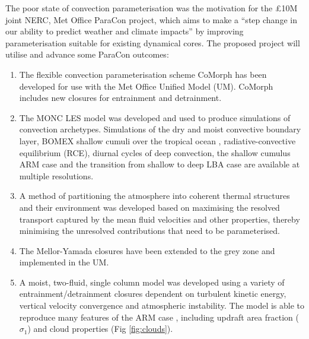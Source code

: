 \documentclass[11pt,a4paper]{article}
\begin{document}
The poor state of convection parameterisation was the motivation for the \pounds 10M joint NERC, Met Office ParaCon project, which aims to make a ``step change in our ability to predict weather and climate impacts'' by improving parameterisation suitable for existing dynamical cores. The proposed project will utilise and advance some ParaCon outcomes:
\begin{enumerate}
\item The flexible convection parameterisation scheme CoMorph has been developed for use with the Met Office Unified Model (UM). CoMorph includes new closures for entrainment and detrainment.

\item The MONC LES model was developed and used to produce simulations of convection archetypes. Simulations of the dry and moist convective boundary layer, BOMEX shallow cumuli over the tropical ocean \cite[]{HR73}, radiative-convective equilibrium (RCE), diurnal cycles of deep convection, the shallow cumulus ARM case \cite[]{BCC+02} and the transition from shallow to deep LBA case \cite[]{BFGB02} are available at multiple resolutions.

\item A method of partitioning the atmosphere into coherent thermal structures and their environment was developed \cite[]{ETB20} based on maximising the resolved transport captured by the mean fluid velocities and other properties, thereby minimising the unresolved contributions that need to be parameterised.

\item The Mellor-Yamada closures have been extended to the grey zone and implemented in the UM.

\item A moist, two-fluid, single column model was developed using a variety of entrainment/detrainment closures dependent on turbulent kinetic energy, vertical velocity convergence and atmospheric instability. The model is able to reproduce many features of the ARM case \cite[]{BCC+02}, including updraft area fraction ($\sigma_1$)  and cloud properties (Fig \ref{fig:clouds}). 


\end{enumerate}
\end{document}
